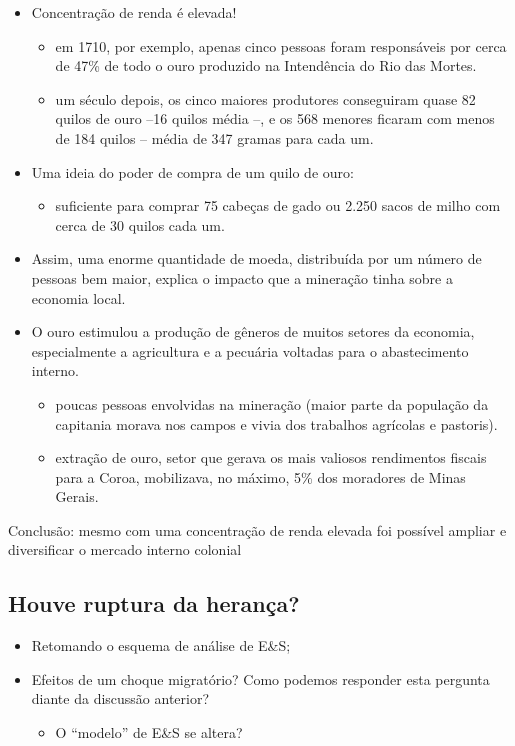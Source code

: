 \documentclass[a4paper,12pt]{article}[abntex2]
\begin{document}
\begin{itemize}
    \item Concentração de renda é elevada! \begin{itemize}
        \item em 1710, por exemplo, apenas cinco pessoas foram responsáveis por cerca de 47\% de todo o ouro produzido na Intendência do Rio das Mortes.
        \item um século depois, os cinco maiores produtores conseguiram quase 82 quilos de ouro –16 quilos média –, e os 568 menores ficaram com menos de 184 quilos – média de 347 gramas para cada um.
    \end{itemize}
    \item Uma ideia do poder de compra de um quilo de ouro: \begin{itemize}
        \item suficiente para comprar 75 cabeças de gado ou 
2.250 sacos de milho com cerca de 30 quilos cada um.
    \end{itemize}
    \item Assim, uma enorme quantidade de moeda, distribuída por um número de pessoas bem maior, explica o impacto que a mineração tinha sobre a economia local. 
    \item O ouro estimulou a produção de gêneros de muitos setores da economia, especialmente a agricultura e a pecuária voltadas para o abastecimento interno. \begin{itemize}
        \item  poucas pessoas envolvidas na mineração (maior parte da população da capitania morava nos campos e vivia dos trabalhos agrícolas e pastoris). 
        \item extração de ouro, setor que gerava os mais valiosos rendimentos fiscais para a Coroa, mobilizava, no máximo, 5\% dos moradores de Minas Gerais.
    \end{itemize}
\end{itemize}

Conclusão: mesmo com uma concentração de renda elevada foi possível ampliar e diversificar o mercado interno colonial

\subsection{\textbf{Houve ruptura da herança?}}
\begin{itemize}
    \item Retomando o esquema de análise de 
E\&S;
    \item Efeitos de um choque migratório? Como podemos responder esta pergunta diante da discussão anterior? \begin{itemize}
        \item O “modelo” de E\&S se altera?
    \end{itemize}
\end{itemize}
\end{document}
